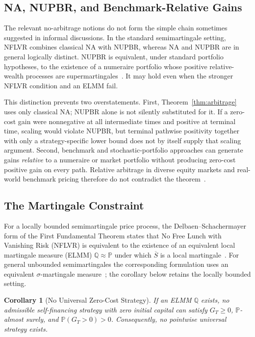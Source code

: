 \documentclass[aps,pra,reprint,superscriptaddress,amsmath,amssymb,floatfix]{revtex4-2}
\theoremstyle{plain}
\newtheorem{corollary}[theorem]{Corollary}
\theoremstyle{definition}
\theoremstyle{remark}
\begin{document}
\subsection{NA, NUPBR, and Benchmark-Relative Gains}

The relevant no-arbitrage notions do not form the simple chain sometimes
suggested in informal discussions. In the standard semimartingale setting,
NFLVR combines classical NA with NUPBR, whereas NA and NUPBR are in general
logically distinct. NUPBR is equivalent, under standard portfolio hypotheses,
to the existence of a numeraire portfolio whose positive relative-wealth
processes are supermartingales~\cite{KaratzasKardaras2007,Kardaras2012}.
It may hold even when the stronger NFLVR condition and an ELMM fail.

This distinction prevents two overstatements. First, Theorem~\ref{thm:arbitrage}
uses only classical NA; NUPBR alone is not silently substituted for it. If a
zero-cost gain were nonnegative at all intermediate times and positive at
terminal time, scaling would violate NUPBR, but terminal pathwise positivity
together with only a strategy-specific lower bound does not by itself supply
that scaling argument. Second, benchmark and stochastic-portfolio approaches
can generate gains \emph{relative} to a numeraire or market portfolio without
producing zero-cost positive gain on every path. Relative arbitrage in diverse
equity markets and real-world benchmark pricing therefore do not contradict
the theorem~\cite{FernholzKaratzasKardaras2005,PlatenHeath2010}.

\subsection{The Martingale Constraint}

For a locally bounded semimartingale price process, the
Delbaen--Schachermayer form of the First Fundamental Theorem states that No
Free Lunch with Vanishing Risk (NFLVR) is equivalent to the existence of an
equivalent local martingale measure (ELMM)
\(\mathbb{Q}\approx\mathbb{P}\) under which \(\overline S\) is a local
martingale~\cite{Harrison1981,Delbaen1994}. For general unbounded
semimartingales the corresponding formulation uses an equivalent
\(\sigma\)-martingale measure~\cite{DelbaenSchachermayer1998}; the corollary below
retains the locally bounded setting.

\begin{corollary}[No Universal Zero-Cost Strategy]
  \label{cor:noarb}
  If an ELMM \(\mathbb{Q}\) exists, no admissible self-financing strategy with
  zero initial capital can satisfy
  \(G_T\geq0\), \(\mathbb{P}\)-almost surely, and
  \(\mathbb{P}(G_T>0)>0\). Consequently, no pointwise universal strategy
  exists.
\end{corollary}
\end{document}
